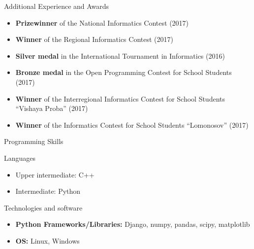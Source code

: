 \documentclass[]{mcdowellcv}
\begin{document}
	\begin{cvsection}{Additional Experience and Awards}
            \vskip 0.1cm
		\begin{cvsubsection}{}{}{}
			\begin{itemize}
                            \item \textbf{Prizewinner} of the National Informatics Contest (2017)
                            \item \textbf{Winner} of the Regional Informatics Contest (2017)
                            \item \textbf{Silver medal} in the International Tournament in Informatics (2016)
                            \item \textbf{Bronze medal} in the Open Programming Contest for School Students (2017)
                            \item \textbf{Winner} of the Interregional Informatics Contest for School Students ``Vishaya Proba'' (2017)
                            \item \textbf{Winner} of the Informatics Contest for School Students ``Lomonosov'' (2017)
			\end{itemize}
		\end{cvsubsection}
	\end{cvsection}

	\begin{cvsection}{Programming Skills}
            \vskip 0.1cm
		\begin{cvsubsection}{Languages}{}{}
			\begin{itemize}
                            \item Upper intermediate: C++
                            \item Intermediate: Python
			\end{itemize}
		\end{cvsubsection}
                \begin{cvsubsection}{Technologies and software}{}{}
                    \begin{itemize}
                        \item \textbf{Python Frameworks/Libraries:} Django, numpy, pandas, scipy, matplotlib
                        \item \textbf{OS:} Linux, Windows
                    \end{itemize}
                \end{cvsubsection}
	\end{cvsection}
\end{document}
